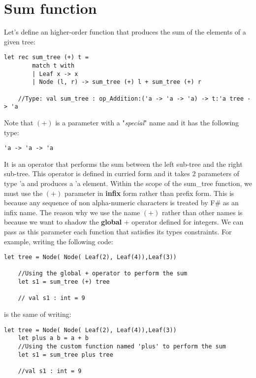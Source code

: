 \section{Sum function}
Let's define an higher-order function that produces the sum of the elements of a given tree:
\begin{lstlisting}[style = FSharpStyle]
    let rec sum_tree (+) t =
        match t with
        | Leaf x -> x
        | Node (l, r) -> sum_tree (+) l + sum_tree (+) r

    //Type: val sum_tree : op_Addition:('a -> 'a -> 'a) -> t:'a tree -> 'a
\end{lstlisting}
Note that $(+)$ is a parameter with a "\textit{special}" name and it has the following type:
\begin{lstlisting}[style = FSharpStyle]
    'a -> 'a -> 'a
\end{lstlisting}
It is an operator that performs the sum between the left sub-tree and the right sub-tree. This operator is defined in curried form and it takes 2 parameters of type 'a and produces a 'a element. Within the scope of the sum\_tree function, we must use the $(+)$ parameter in \textbf{infix} form rather than prefix form. This is because any sequence of non alpha-numeric characters is treated by F\# as an infix name. The reason why we use the name $(+)$ rather than other names is because we want to shadow the \textbf{global} $+$ operator defined for integers. We can pass as this parameter each function that satisfies its types constraints.\newline\newline
For example, writing the following code:
\begin{lstlisting}[style = FSharpStyle]
    let tree = Node( Node( Leaf(2), Leaf(4)),Leaf(3))

    //Using the global + operator to perform the sum
    let s1 = sum_tree (+) tree

    // val s1 : int = 9
\end{lstlisting}
is the same of writing:
\begin{lstlisting}[style = FSharpStyle]
    let tree = Node( Node( Leaf(2), Leaf(4)),Leaf(3))
    let plus a b = a + b
    //Using the custom function named 'plus' to perform the sum
    let s1 = sum_tree plus tree

    //val s1 : int = 9
\end{lstlisting}

